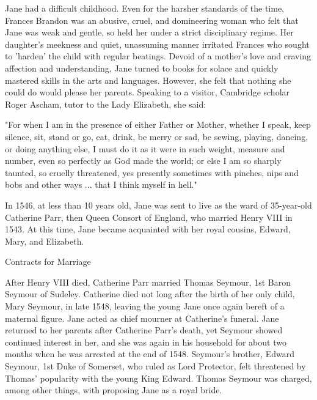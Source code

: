 \documentclass{article}
\begin{document}
Jane had a difficult childhood. Even for the harsher standards of the time, Frances Brandon was an abusive, cruel, and domineering woman who felt that Jane was weak and gentle, so held her under a strict disciplinary regime. Her daughter's meekness and quiet, unassuming manner irritated Frances who sought to 'harden' the child with regular beatings. Devoid of a mother's love and craving affection and understanding, Jane turned to books for solace and quickly mastered skills in the arts and languages. However, she felt that nothing she could do would please her parents. Speaking to a visitor, Cambridge scholar Roger Ascham, tutor to the Lady Elizabeth, she said:

"For when I am in the presence of either Father or Mother, whether I speak, keep silence, sit, stand or go, eat, drink, be merry or sad, be sewing, playing, dancing, or doing anything else, I must do it as it were in such weight, measure and number, even so perfectly as God made the world; or else I am so sharply taunted, so cruelly threatened, yes presently sometimes with pinches, nips and bobs and other ways ... that I think myself in hell."

In 1546, at less than 10 years old, Jane was sent to live as the ward of 35-year-old Catherine Parr, then Queen Consort of England, who married Henry VIII in 1543. At this time, Jane became acquainted with her royal cousins, Edward, Mary, and Elizabeth.


Contracts for Marriage

After Henry VIII died, Catherine Parr married Thomas Seymour, 1st Baron Seymour of Sudeley. Catherine died not long after the birth of her only child, Mary Seymour, in late 1548, leaving the young Jane once again bereft of a maternal figure. Jane acted as chief mourner at Catherine's funeral. Jane returned to her parents after Catherine Parr's death, yet Seymour showed continued interest in her, and she was again in his household for about two months when he was arrested at the end of 1548. Seymour's brother, Edward Seymour, 1st Duke of Somerset, who ruled as Lord Protector, felt threatened by Thomas' popularity with the young King Edward. Thomas Seymour was charged, among other things, with proposing Jane as a royal bride.
\end{document}
